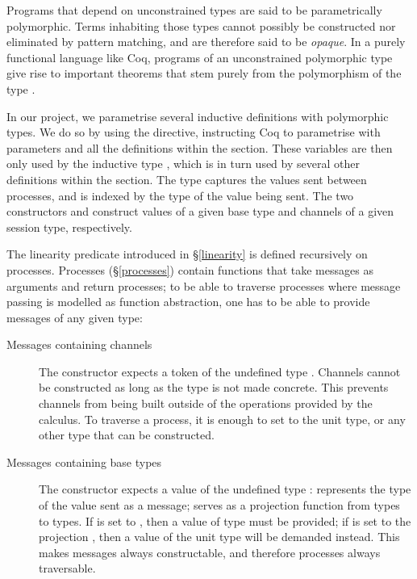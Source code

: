 \documentclass{mproj}
\begin{document}
Programs that depend on unconstrained types are said to be parametrically polymorphic. Terms inhabiting those types cannot possibly be constructed nor eliminated by pattern matching, and are therefore said to be \emph{opaque}. In a purely functional language like Coq, programs of an unconstrained polymorphic type give rise to important theorems that stem purely from the polymorphism of the type \cite{Wadler1989}.

In our project, we parametrise several inductive definitions with polymorphic types. We do so by using the  directive, instructing Coq to parametrise with parameters  and  all the definitions within the section. These variables are then only used by the inductive type , which is in turn used by several other definitions within the section. The type  captures the values sent between processes, and is indexed by the type of the value being sent. The two constructors  and  construct values of a given base type and channels of a given session type, respectively.


The linearity predicate introduced in \S \ref{linearity} is defined recursively on processes. Processes (\S \ref{processes}) contain functions that take messages as arguments and return processes; to be able to traverse processes where message passing is modelled as function abstraction, one has to be able to provide messages of any given type:
\begin{description}
    \item [Messages containing channels] The  constructor expects a token of the undefined type . Channels cannot be constructed as long as the type  is not made concrete. This prevents channels from being built outside of the operations provided by the calculus. To traverse a process, it is enough to set  to the unit type, or any other type that can be constructed.
        
    \item [Messages containing base types] The  constructor expects a value of the undefined type :  represents the type of the value sent as a message;  serves as a projection function from types to types. If  is set to , then a value of type  must be provided; if  is set to the projection , then a value of the unit type will be demanded instead. This makes messages always constructable, and therefore processes always traversable. 
\end{description}
\end{document}
